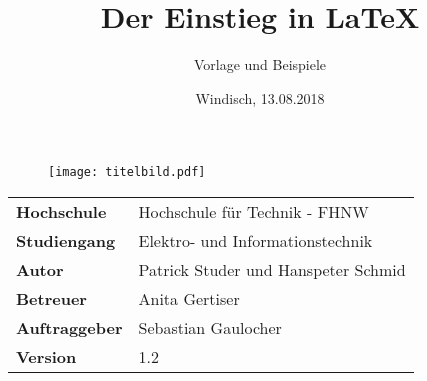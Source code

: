 \documentclass[final]{fhnwreport}       %
\title{Der Einstieg in \LaTeX}          %
\author{Vorlage und Beispiele}          %
\date{Windisch, 13.08.2018}             %
\begin{document}
\maketitle

\vspace*{-1cm}						    %
\vfill
\begin{figure}[H]
\centering
\texttt{[image: titelbild.pdf]}
\end{figure}
\vfill

{
\renewcommand\arraystretch{2}
\begin{center}
\begin{tabular}{>{\bf}p{4cm} l}
Hochschule                 &    Hochschule für Technik - FHNW\\
Studiengang                &    Elektro- und Informationstechnik\\
Autor   		           & 	Patrick Studer und Hanspeter Schmid\\
Betreuer                 	  &    Anita Gertiser\\
Auftraggeber               &    Sebastian Gaulocher\\
Version                    &    1.2 %
\end{tabular}
\end{center}
}

\clearpage
			
\thispagestyle{empty}


\tableofcontents
\clearpage







{\sloppypar
\printbibliography[heading=bibintoc]
\label{sec:lit}
\printbibliography[heading=bibintoc]
}



{%
}
\end{document}

